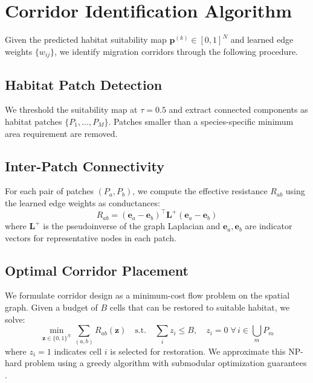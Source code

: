 \section{Corridor Identification Algorithm}

\label{sec:corridors}

Given the predicted habitat suitability map $\mathbf{p}^{(k)} \in
[0,1]^N$ and learned edge weights $\{w_{ij}\}$, we identify migration
corridors through the following procedure.

\subsection{Habitat Patch Detection}

We threshold the suitability map at $\tau = 0.5$ and extract connected
components as habitat patches $\{P_1, \ldots, P_M\}$. Patches smaller
than a species-specific minimum area requirement are removed.

\subsection{Inter-Patch Connectivity}

For each pair of patches $(P_a, P_b)$, we compute the effective
resistance $R_{ab}$ using the learned edge weights as conductances:
\begin{equation}
  R_{ab} = (\mathbf{e}_a - \mathbf{e}_b)^\top \mathbf{L}^{+}
  (\mathbf{e}_a - \mathbf{e}_b)
\end{equation}
where $\mathbf{L}^{+}$ is the pseudoinverse of the graph Laplacian and
$\mathbf{e}_a, \mathbf{e}_b$ are indicator vectors for representative
nodes in each patch.

\subsection{Optimal Corridor Placement}

We formulate corridor design as a minimum-cost flow problem on the
spatial graph. Given a budget of $B$ cells that can be restored to
suitable habitat, we solve:
\begin{equation}
  \min_{\mathbf{z} \in \{0,1\}^N} \sum_{(a,b)} R_{ab}(\mathbf{z})
  \quad \text{s.t.} \quad \sum_i z_i \leq B, \quad z_i = 0 \;
  \forall\, i \in \bigcup_m P_m
\end{equation}
where $z_i = 1$ indicates cell $i$ is selected for restoration. We
approximate this NP-hard problem using a greedy algorithm with
submodular optimization guarantees \citep{nemhauser1978analysis}.

